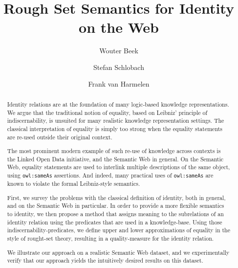 \documentclass{ecai2014}
\begin{document}
\title{Rough Set Semantics for Identity on the Web}

\author{Wouter Beek \and Stefan Schlobach \and Frank van Harmelen }

\maketitle



\begin{abstract}
 Identity relations are at the foundation of many
  logic-based knowledge representations.
We argue that the traditional notion of equality,
  based on Leibniz' principle of indiscernability,
  is unsuited for many realistic knowledge representation settings.
The classical  interpretation of equality is simply too strong
  when the equality statements are re-used outside their original context.

The most prominent modern example of such re-use of knowledge across contexts
  is the Linked Open Data initiative, and the Semantic Web in general.
On the Semantic Web, equality statements are used to interlink
  multiple descriptions of the same object,
  using {\small \texttt{owl:sameAs}} assertions.
And indeed, many practical uses of {\small \texttt{owl:sameAs}}
  are known to violate the formal Leibniz-style semantics.

First, we survey the problems with the classical definition of identity,
  both in general, and on the Semantic Web in particular. 
In order to provide a more flexible semantics to identity,
  we then propose a method that assigns meaning to the subrelations of
  an identity relation using the predicates that are used in a knowledge-base.
Using those indiscernability-predicates,
  we define upper and lower approximations of equality in the style of
  rought-set theory, resulting in a quality-measure for
  the identity relation.

We illustrate our approach on a realistic Semantic Web dataset,
  and we experimentally verify that our approach yields
  the intuitively desired results on this dataset.
\end{abstract}

















\end{document}
